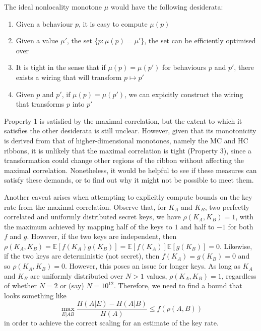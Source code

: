 \documentclass[10pt, a4paper]{article}
\numberwithin{equation}{section} %
\theoremstyle{definition}
\theoremstyle{plain}
\newcommand{\st}{\mathrel{:}} %
\newcommand{\?}{\mathrel{?}} %
\newcommand{\E}{\mathbb{E}} %
\begin{document}
    The ideal nonlocality monotone \(\mu\) would have the following desiderata:
    \begin{enumerate}
      \item Given a behaviour \(p\), it is easy to compute \(\mu(p)\)
      \item Given a value \(\mu'\), the set \(\{ p \st \mu(p) = \mu' \}\), the set can be efficiently optimised over
      \item It is tight in the sense that if \(\mu(p) = \mu(p')\) for behaviours \(p\) and \(p'\), there exists a wiring that will transform \(p \mapsto p'\)
      \item Given \(p\) and \(p'\), if \(\mu(p) = \mu(p')\), we can expicitly construct the wiring that transforms \(p\) into \(p'\)
    \end{enumerate}

    Property 1 is satisfied by the maximal correlation, but the extent to which it satisfies the other desiderata is still unclear. However, given that its monotonicity is derived from that of higher-dimensional monotones, namely the MC and HC ribbons, it is unlikely that the maximal correlation is tight (Property 3), since a transformation could change other regions of the ribbon without affecting the maximal correlation. Nonetheless, it would be helpful to see if these measures can satisfy these demands, or to find out why it might not be possible to meet them.

    Another caveat arises when attempting to explicitly compute bounds on the key rate from the maximal correlation. Observe that, for \(K_A\) and \(K_B\), two perfectly correlated and uniformly distributed secret keys, we have \(\rho(K_A, K_B) = 1\), with the maximum achieved by mapping half of the keys to \(1\) and half to \(-1\) for both \(f\) and \(g\). However, if the two keys are independent, then \(\rho(K_A,K_B) = \E[f(K_A)g(K_B)] = \E[f(K_A)]\E[g(K_B)] = 0\). Likewise, if the two keys are deterministic (not secret), then \(f(K_A) = g(K_B) = 0\) and so \(\rho(K_A, K_B) = 0\). However, this poses an issue for longer keys. As long as \(K_A\) and \(K_B\) are uniformly distributed over \(N > 1\) values, \(\rho(K_A, K_B) = 1\), regardless of whether \(N = 2\) or (say) \(N = 10^{12}\). Therefore, we need to find a bound that looks something like
    \begin{equation}
      \max_{E|AB} \frac{H(A|E) - H(A|B)}{H(A)} \leq f(\rho(A,B))
    \end{equation}
    in order to achieve the correct scaling for an estimate of the key rate.
\end{document}
